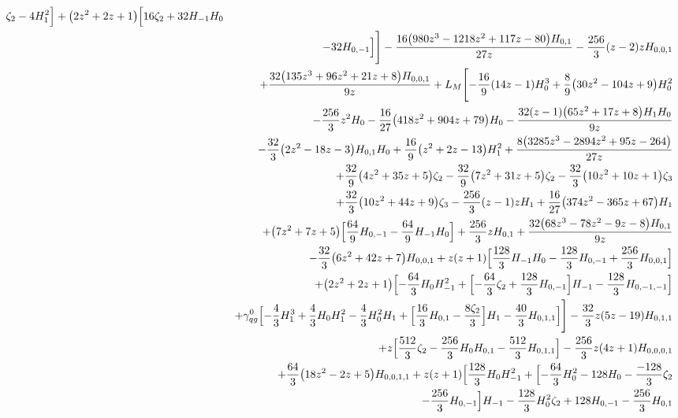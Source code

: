 \begin{eqnarray}
\zeta_2-4 H_1^2\Bigr]+\big(2 z^2+2 z+1\big) \Bigl[16  \zeta_2+32
 H_{-1} H_0
\nonumber \\ &&
-32  H_{0,-1}\Bigr]\Biggr]
-\frac{16 \big(980 z^3-1218
  z^2+117 z-80\big) H_{0,1}}{27 z}-\frac{256}{3}  (z-2) z
H_{0,0,1}
\nonumber \\ &&
+\frac{32 \big(135 z^3+96 z^2+21 z+8\big) H_{0,0,1}}{9 z}
+L_M \Biggl[-\frac{16}{9} (14 z-1) H_0^3+\frac{8}{9}\big(30 z^2-104 z+9\big) H_0^2
\nonumber \\ &&
-\frac{256}{3}  z^2 H_0-\frac{16}{27}\big(418 z^2+904 z+79\big) H_0-\frac{32 (z-1) \big(65 z^2+17 z+8\big) H_1  H_0}{9 z}
\nonumber \\ &&
-\frac{32}{3} \big(2 z^2-18 z-3\big) H_{0,1} H_0+\frac{16}{9}\big(z^2+2 z-13\big) H_1^2+\frac{8 \big(3285 z^3-2894 z^2+95 z-264\big)}{27  z}
\nonumber \\ &&
+\frac{32}{9} \big(4 z^2+35 z+5\big) \zeta_2-\frac{32}{9} \big(7 z^2+31 z+5\big) \zeta_2-\frac{32}{3}  \big(10 z^2+10z+1\big) \zeta_3
\nonumber \\ &&
+\frac{32}{3} \big(10 z^2+44 z+9\big) \zeta_3-\frac{256}{3}  (z-1) z H_1+\frac{16}{27} \big(374 z^2-365 z+67\big)H_1
\nonumber \\ &&
+\big(7 z^2+7 z+5\big) \Bigl[\frac{64}{9}  H_{0,-1}-\frac{64}{9} H_{-1} H_0\Bigr]+\frac{256}{3}  z H_{0,1}
+\frac{32 \big(68 z^3-78  z^2-9 z-8\big) H_{0,1}}{9 z}
\nonumber \\ &&
-\frac{32}{3} \big(6 z^2+42 z+7\big) H_{0,0,1}
+z (z+1) \Bigl[\frac{128}{3}H_{-1} H_0-\frac{128}{3} H_{0,-1}+\frac{256}{3}  H_{0,0,1}\Bigr]
\nonumber \\ &&
+\big(2z^2+2 z+1\big) \Bigl[-\frac{64}{3} H_0 H_{-1}^2+\Bigl[-\frac{64}{3} \zeta_2+\frac{128}{3} H_{0,-1}
\Bigr]H_{-1}-\frac{128}{3}H_{0,-1,-1}
\Bigr]
\nonumber \\ &&
+{\gamma}_{qg}^{0} \Bigl[-\frac{4}{3} H_1^3+\frac{4}{3}H_0 H_1^2-\frac{4}{3} H_0^2 H_1+\Bigl[\frac{16}{3} H_{0,1}-\frac{8 \zeta_2}{3}\Bigr] H_1-\frac{40}{3} H_{0,1,1}\Bigr]\Biggr]
-\frac{32}{3} z (5 z-19)H_{0,1,1}
\nonumber \\ &&
+z \Bigl[\frac{512}{3}  \zeta_2-\frac{256}{3}  H_0H_{0,1}-\frac{512}{3}  H_{0,1,1}\Bigr]-\frac{256}{3} z (4 z+1)H_{0,0,0,1}
\nonumber \\ &&
+\frac{64}{3} \big(18 z^2-2 z+5\big) H_{0,0,1,1}+z (z+1)\Bigl[\frac{128}{3} H_0 H_{-1}^2+\Bigl[-\frac{64}{3} H_0^2-128 H_0-\frac{-128}{3} \zeta_2
\nonumber \\ &&
-\frac{256}{3} H_{0,-1}\Bigr] H_{-1}-\frac{128}{3}  H_0^2 \zeta_2+128 H_{0,-1}-\frac{256}{3}  H_{0,1}

\end{eqnarray}
